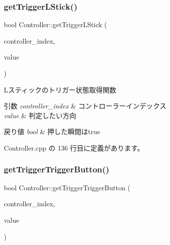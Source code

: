 \subsubsection{\texorpdfstring{get\+Trigger\+L\+Stick()}{getTriggerLStick()}}
{\footnotesize\ttfamily bool Controller\+::get\+Trigger\+L\+Stick (\begin{DoxyParamCaption}\item[{int}]{controller\+\_\+index,  }\item[{\mbox{\hyperlink{class_controller_a08e36bbdccc56ce55cdbd5dcc0f438d4}{Controller\+::\+Direction}}}]{value }\end{DoxyParamCaption})}



Lスティックのトリガー状態取得関数 


\begin{DoxyParams}{引数}
{\em controller\+\_\+index} & コントローラーインデックス \\
\hline
{\em value} & 判定したい方向 \\
\hline
\end{DoxyParams}

\begin{DoxyRetVals}{戻り値}
{\em bool} & 押した瞬間はtrue \\
\hline
\end{DoxyRetVals}


 Controller.\+cpp の 136 行目に定義があります。

\mbox{\label{class_controller_a5b04c7d6998a75601a5af2854a887c5e}} 
\subsubsection{\texorpdfstring{get\+Trigger\+Trigger\+Button()}{getTriggerTriggerButton()}}
{\footnotesize\ttfamily bool Controller\+::get\+Trigger\+Trigger\+Button (\begin{DoxyParamCaption}\item[{int}]{controller\+\_\+index,  }\item[{\mbox{\hyperlink{class_controller_abd7dd769d06d277d3aae9afcf135a4ee}{Controller\+::\+Trigger\+Button}}}]{value }\end{DoxyParamCaption})}



